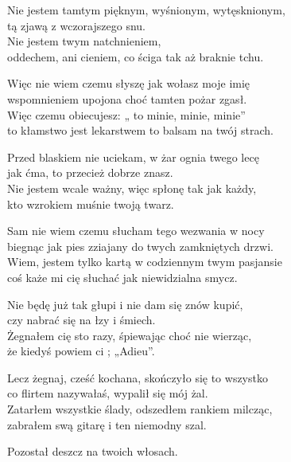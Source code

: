 \begin{text}
    \small{
    Nie jestem tamtym pięknym, wyśnionym, wytęsknionym,\\
    tą zjawą z wczorajszego snu.\\
    Nie jestem twym natchnieniem,\\
    oddechem, ani cieniem, co ściga tak aż braknie tchu.

    Więc nie wiem czemu słyszę jak wołasz moje imię\\
    wspomnieniem upojona choć tamten pożar zgasł.\\
    Więc czemu obiecujesz: „ to minie, minie, minie”\\
    to kłamstwo jest lekarstwem to balsam na twój strach.

    Przed blaskiem nie uciekam, w żar ognia twego lecę\\
    jak ćma, to przecież dobrze znasz.\\
    Nie jestem wcale ważny, więc spłonę tak jak każdy,\\
    kto wzrokiem muśnie twoją twarz.

    Sam nie wiem czemu słucham tego wezwania w nocy\\
    biegnąc jak pies zziajany do twych zamkniętych drzwi.\\
    Wiem, jestem tylko kartą w codziennym twym pasjansie\\
    coś każe mi cię słuchać jak niewidzialna smycz.

    Nie będę już tak głupi i nie dam się znów kupić,\\
    czy nabrać się na łzy i śmiech.\\
    Żegnałem cię sto razy, śpiewając choć nie wierząc,\\
    że kiedyś powiem ci ; „Adieu”.

    Lecz żegnaj, cześć kochana, skończyło się to wszystko\\
    co flirtem nazywałaś, wypalił się mój żal.\\
    Zatarłem wszystkie ślady, odszedłem rankiem milcząc,\\
    zabrałem swą gitarę i ten niemodny szal.

    Pozostał deszcz na twoich włosach.
    }
\end{text}
\begin{chord}

\end{chord}